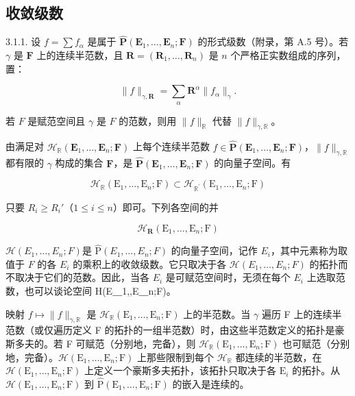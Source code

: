 \subsection{收敛级数}

3.1.1. 设 \(f = \sum f_{\alpha}\) 是属于 \(\hat{\mathbf{P}}(\mathbf{E}_1, \ldots, \mathbf{E}_n; \mathbf{F})\) 的形式级数（附录，第 A.5 号）。若 \(\gamma\) 是 \(\mathbf{F}\) 上的连续半范数，且 \(\mathbf{R} = (\mathbf{R}_1, \ldots, \mathbf{R}_n)\) 是 \(n\) 个严格正实数组成的序列，置：

\[
\| f \| _ {\gamma , \mathbf {R}} = \sum_ {\alpha} \mathbf {R} ^ {\alpha} \| f _ {\alpha} \| _ {\gamma}.
\]

若 \(F\) 是赋范空间且 \(\gamma\) 是 \(F\) 的范数，则用 \(\| f \|_{\mathbb{R}}\) 代替 \(\| f \|_{\gamma, \mathbb{R}}\)。

由满足对 \(\mathcal{H}_{\mathbb{R}}(\mathbf{E}_{1},\ldots,\mathbf{E}_{n};\mathbf{F})\) 上每个连续半范数 \(f\in\hat{\mathbf{P}}(\mathbf{E}_{1},\ldots,\mathbf{E}_{n};\mathbf{F})\)，\(\|f\|_{\gamma,\mathbb{R}}\) 都有限的 \(\gamma\) 构成的集合 \(\mathbf{F}\)，是 \(\hat{\mathbf{P}}(\mathbf{E}_{1},\ldots,\mathbf{E}_{n};\mathbf{F})\) 的向量子空间。有

\[
\mathcal {H} _ {\mathbb {R}} (\mathrm{E} _ {1}, \dots , \mathrm{E} _ {n}; \mathrm{F}) \subset \mathcal {H} _ {\mathbb {R} ^ {\prime}} (\mathrm{E} _ {1}, \dots , \mathrm{E} _ {n}; \mathrm{F})
\]

只要 \(R_{i} \geqslant R_{i}'\)（\(1 \leqslant i \leqslant n\)）即可。下列各空间的并

\[
\mathcal {H} _ {\mathbf {R}} (\mathrm{E} _ {1}, \dots , \mathrm{E} _ {n}; \mathrm{F})
\]

\(\mathcal{H}(E_{1},\ldots,E_{n};F)\)是 \(\hat{\mathrm{P}}(E_{1},\ldots,E_{n};F)\) 的向量子空间，记作 \(E_{i}\)，其中元素称为取值于 \(F\) 的各 \(E_{i}\) 的乘积上的收敛级数。它只取决于各 \(\mathcal{H}(E_{1},\ldots,E_{n};F)\) 的拓扑而不取决于它们的范数。因此，当各 \(E_{i}\) 是可赋范空间时，无须在每个 \(E_{i}\) 上选取范数，也可以谈论空间 H(E＿1,,E＿n;F)。

映射 \(f\mapsto\|f\|_{\gamma,\mathbb{R}}\) 是 \(\mathcal{H}_{\mathbb{R}}(\mathrm{E}_{1},\ldots,\mathrm{E}_{n};\mathrm{F})\) 上的半范数。当 \(\gamma\) 遍历 F 上的连续半范数（或仅遍历定义 F 的拓扑的一组半范数）时，由这些半范数定义的拓扑是豪斯多夫的。若 F 可赋范（分别地，完备），则 \(\mathcal{H}_{\mathbb{R}}(\mathrm{E}_{1},\ldots,\mathrm{E}_{n};\mathrm{F})\) 也可赋范（分别地，完备）。\(\mathcal{H}(\mathrm{E}_{1},\ldots,\mathrm{E}_{n};\mathrm{F})\) 上那些限制到每个 \(\mathcal{H}_{\mathbb{R}}\) 都连续的半范数，在 \(\mathcal{H}(\mathrm{E}_{1},\ldots,\mathrm{E}_{n};\mathrm{F})\) 上定义一个豪斯多夫拓扑，该拓扑只取决于各 \(\mathrm{E}_{i}\) 的拓扑。从 \(\mathcal{H}(\mathrm{E}_{1},\ldots,\mathrm{E}_{n};\mathrm{F})\) 到 \(\hat{\mathrm{P}}(\mathrm{E}_{1},\ldots,\mathrm{E}_{n};\mathrm{F})\) 的嵌入是连续的。

